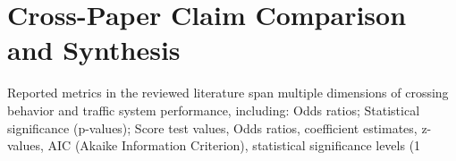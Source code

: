 \documentclass{article}
\begin{document}
\section{Cross-Paper Claim Comparison and Synthesis}
Reported metrics in the reviewed literature span multiple dimensions of crossing behavior and traffic system performance, including: Odds ratios; Statistical significance (p-values); Score test values, Odds ratios, coefficient estimates, z-values, AIC (Akaike Information Criterion), statistical significance levels (1%
\end{document}
